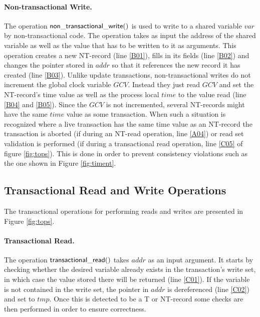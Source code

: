 \documentclass[runningheads,a4paper]{llncs}
\begin{document}
\paragraph{Non-transactional Write.}
The operation ${\sf non\_transactional\_write()}$ is used to write to 
a shared variable $\mathit{var}$ 
by non-transactional code.
The operation takes as input the address of the shared variable as well as the 
value that has to be written to it as arguments.
This operation  
creates a  new  NT-record  (line  \ref{B01}),  fills  in  its  fields  (line
\ref{B02})  and 
changes the pointer stored in $\mathit{addr}$ so that it references the 
new record it has created  (line \ref{B03}).
Unlike update transactions, non-transactional writes do not increment
the global clock variable $\mathit{GCV}$.
Instead they just read $\mathit{GCV}$ and set the NT-record's time value as well as
the process local $\mathit{time}$ to the value read (line \ref{B04} and \ref{B05}).
Since the $\mathit{GCV}$ is not incremented, several NT-records might have the same
$\mathit{time}$ value as some transaction.
When such a situation is recognized where a live transaction has the same time value
as an NT-record the transaction is aborted (if during an NT-read operation,
line \ref{A04}) or read set validation is performed (if during a transactional
read operation, line \ref{C05} of figure \ref{fig:tops}).
This is done in order to prevent consistency violations such as the one shown 
in Figure \ref{fig:timent}.


\subsection{Transactional Read and Write Operations}

The transactional operations for performing reads and writes are 
presented in Figure \ref{fig:tops}. 

\paragraph{Transactional Read.}

The operation ${\sf  transactional\_read()}$ takes $\mathit{addr}$ as an
input argument. It starts by checking  
whether the  desired variable already  exists in the  transaction{}'s write
set, in which  
case  the   value  stored there  will   be  returned  (line
\ref{C01}). If the variable is not contained  
in  the write  set, the  pointer in  $\mathit{addr}$ is  dereferenced (line
\ref{C02}) and set to $\mathit{tmp}$. Once this is detected to be a T or NT-record
some checks are then performed in order to ensure correctness.
\end{document}
